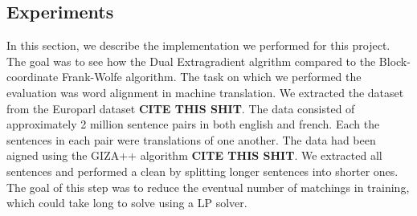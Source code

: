 \subsection{Experiments}
In this section, we describe the implementation we performed for this project.
The goal was to see how the Dual Extragradient algrithm compared to the
Block-coordinate Frank-Wolfe algorithm. The task on which we performed the
evaluation was word alignment in machine translation. We extracted the dataset
from the Europarl dataset \textbf{CITE THIS SHIT}. The data consisted of
approximately 2 million sentence pairs in both english and french. Each the
sentences in each pair were translations of one another. The data had been
aigned using the GIZA++ algorithm \textbf{CITE THIS SHIT}. We extracted all
sentences and performed a clean by splitting longer sentences into shorter ones.
The goal of this step was to reduce the eventual number of matchings in
training, which could take long to solve using a LP solver.

